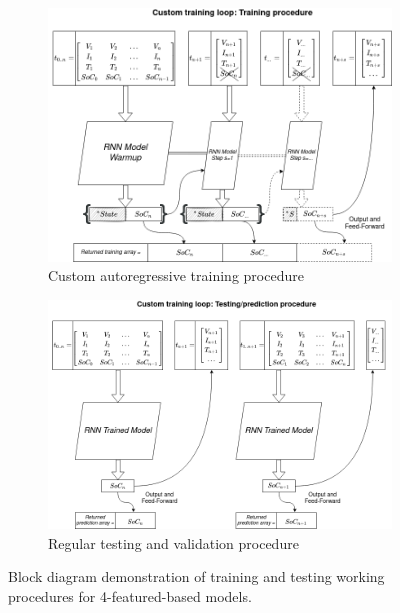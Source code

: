 \begin{figure}[htbp]
    \centering
    \begin{subfigure}[b]{0.85\textwidth}
        \centering
        \includegraphics[width=\linewidth]{II_Body/images/Autoregression-Training.png}
        \caption{Custom autoregressive training procedure}
        \label{subfig:training}
    \end{subfigure}
    \hfill
    \begin{subfigure}[b]{0.85\textwidth}
        \centering
        \includegraphics[width=\linewidth]{II_Body/images/Autoregression-Testing.png}
        \caption{Regular testing and validation procedure}
        \label{subfig:testing}
    \end{subfigure}
    \caption{Block diagram demonstration of training and testing working procedures for 4-featured-based models.}
    \label{fig:training_testing}
\end{figure}
